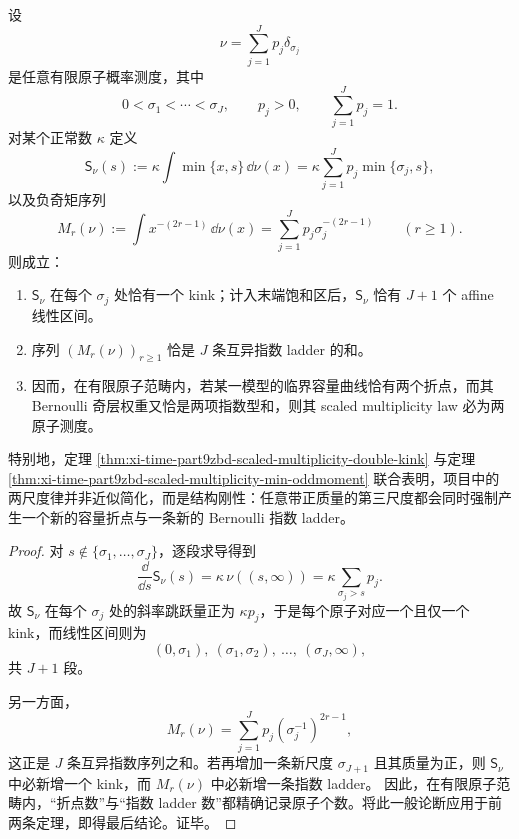 \begin{theorem}\label{thm:xi-time-part9zbd-finite-atomic-kink-ladder-rigidity}
设
\[
\nu=\sum_{j=1}^{J}p_j\delta_{\sigma_j}
\]
是任意有限原子概率测度，其中
\[
0<\sigma_1<\cdots<\sigma_J,
\qquad
p_j>0,
\qquad
\sum_{j=1}^{J}p_j=1.
\]
对某个正常数 \(\kappa\) 定义
\[
\mathsf S_\nu(s):=
\kappa\int \min\{x,s\}\,\dd\nu(x)
=
\kappa\sum_{j=1}^{J}p_j\min\{\sigma_j,s\},
\]
以及负奇矩序列
\[
M_r(\nu):=
\int x^{-(2r-1)}\,\dd\nu(x)
=
\sum_{j=1}^{J}p_j\sigma_j^{-(2r-1)}
\qquad (r\ge 1).
\]
则成立：
\begin{enumerate}
  \item \(\mathsf S_\nu\) 在每个 \(\sigma_j\) 处恰有一个 kink；计入末端饱和区后，\(\mathsf S_\nu\) 恰有 \(J+1\) 个 affine 线性区间。
  \item 序列 \((M_r(\nu))_{r\ge 1}\) 恰是 \(J\) 条互异指数 ladder 的和。
  \item 因而，在有限原子范畴内，若某一模型的临界容量曲线恰有两个折点，而其 Bernoulli 奇层权重又恰是两项指数型和，则其 scaled multiplicity law 必为两原子测度。
\end{enumerate}
特别地，定理 \ref{thm:xi-time-part9zbd-scaled-multiplicity-double-kink} 与定理 \ref{thm:xi-time-part9zbd-scaled-multiplicity-min-oddmoment} 联合表明，项目中的两尺度律并非近似简化，而是结构刚性：任意带正质量的第三尺度都会同时强制产生一个新的容量折点与一条新的 Bernoulli 指数 ladder。
\end{theorem}
\begin{proof}
对 \(s\notin\{\sigma_1,\dots,\sigma_J\}\)，逐段求导得到
\[
\frac{\dd}{\dd s}\mathsf S_\nu(s)
=
\kappa\,\nu((s,\infty))
=
\kappa\sum_{\sigma_j>s}p_j.
\]
故 \(\mathsf S_\nu\) 在每个 \(\sigma_j\) 处的斜率跳跃量正为 \(\kappa p_j\)，于是每个原子对应一个且仅一个 kink，而线性区间则为
\[
(0,\sigma_1),\ (\sigma_1,\sigma_2),\ \dots,\ (\sigma_J,\infty),
\]
共 \(J+1\) 段。

另一方面，
\[
M_r(\nu)=\sum_{j=1}^{J}p_j(\sigma_j^{-1})^{2r-1},
\]
这正是 \(J\) 条互异指数序列之和。若再增加一条新尺度 \(\sigma_{J+1}\) 且其质量为正，则 \(\mathsf S_\nu\) 中必新增一个 kink，而 \(M_r(\nu)\) 中必新增一条指数 ladder。
因此，在有限原子范畴内，“折点数”与“指数 ladder 数”都精确记录原子个数。将此一般论断应用于前两条定理，即得最后结论。证毕。
\end{proof}

